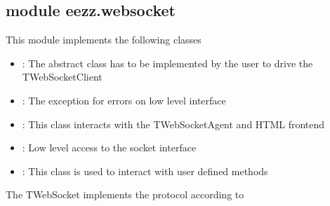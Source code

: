 \documentclass[letterpaper,10pt,english]{sphinxmanual}
\begin{document}
\subsection{module eezz.websocket}
\label{\detokenize{eezz:module-eezz.websocket}}\label{\detokenize{eezz:module-eezz-websocket}}
\sphinxAtStartPar
This module implements the following classes
\begin{itemize}
\item {} 
\sphinxAtStartPar
{\hyperref[\detokenize{eezz:eezz.websocket.TWebSocketAgent}]{}}:       The abstract class has to be implemented by the user to     drive the TWebSocketClient

\item {} 
\sphinxAtStartPar
{\hyperref[\detokenize{eezz:eezz.websocket.TWebSocketException}]{}}:   The exception for errors on low level interface

\item {} 
\sphinxAtStartPar
{\hyperref[\detokenize{eezz:eezz.websocket.TWebSocketClient}]{}}:      This class interacts with the TWebSocketAgent and HTML frontend

\item {} 
\sphinxAtStartPar
{\hyperref[\detokenize{eezz:eezz.websocket.TWebSocket}]{}}:            Low level access to the socket interface

\item {} 
\sphinxAtStartPar
{\hyperref[\detokenize{eezz:eezz.websocket.TAsyncHandler}]{}}:         This class is used to interact with user defined methods

\end{itemize}

\sphinxAtStartPar
The TWebSocket implements the protocol according to
%
\begin{footnote}[2]\sphinxAtStartFootnote
{}
%
\end{footnote}
\end{document}
